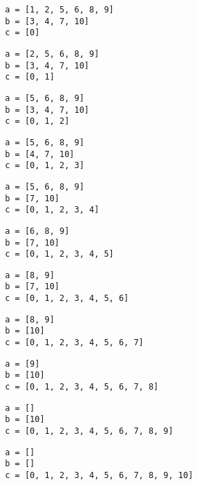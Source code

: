 { \begin{verbatim}
        a = [1, 2, 5, 6, 8, 9]
        b = [3, 4, 7, 10]
        c = [0]
\end{verbatim} }

{ \begin{verbatim}
        a = [2, 5, 6, 8, 9]
        b = [3, 4, 7, 10]
        c = [0, 1]
\end{verbatim} }

{ \begin{verbatim}
        a = [5, 6, 8, 9]
        b = [3, 4, 7, 10]
        c = [0, 1, 2]
\end{verbatim} }

{ \begin{verbatim}
        a = [5, 6, 8, 9]
        b = [4, 7, 10]
        c = [0, 1, 2, 3]
\end{verbatim} }

{ \begin{verbatim}
        a = [5, 6, 8, 9]
        b = [7, 10]
        c = [0, 1, 2, 3, 4]
\end{verbatim} }

{ \begin{verbatim}
        a = [6, 8, 9]
        b = [7, 10]
        c = [0, 1, 2, 3, 4, 5]
\end{verbatim} }

{ \begin{verbatim}
        a = [8, 9]
        b = [7, 10]
        c = [0, 1, 2, 3, 4, 5, 6]
\end{verbatim} }

{ \begin{verbatim}
        a = [8, 9]
        b = [10]
        c = [0, 1, 2, 3, 4, 5, 6, 7]
\end{verbatim} }

{ \begin{verbatim}
        a = [9]
        b = [10]
        c = [0, 1, 2, 3, 4, 5, 6, 7, 8]
\end{verbatim} }

{ \begin{verbatim}
        a = []
        b = [10]
        c = [0, 1, 2, 3, 4, 5, 6, 7, 8, 9]
\end{verbatim} }

{ \begin{verbatim}
        a = []
        b = []
        c = [0, 1, 2, 3, 4, 5, 6, 7, 8, 9, 10]
\end{verbatim} }

